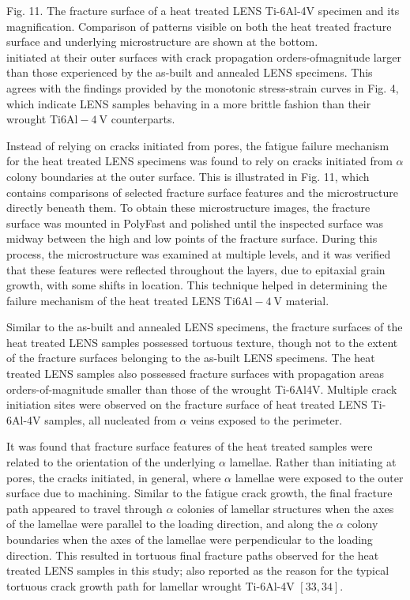 \documentclass[10pt]{article}
\begin{document}
Fig. 11. The fracture surface of a heat treated LENS Ti-6Al-4V specimen and its magnification. Comparison of patterns visible on both the heat treated fracture surface and underlying microstructure are shown at the bottom.\\
initiated at their outer surfaces with crack propagation orders-ofmagnitude larger than those experienced by the as-built and annealed LENS specimens. This agrees with the findings provided by the monotonic stress-strain curves in Fig. 4, which indicate LENS samples behaving in a more brittle fashion than their wrought Ti$6 \mathrm{Al}-4 \mathrm{~V}$ counterparts.

Instead of relying on cracks initiated from pores, the fatigue failure mechanism for the heat treated LENS specimens was found to rely on cracks initiated from $\alpha$ colony boundaries at the outer surface. This is illustrated in Fig. 11, which contains comparisons of selected fracture surface features and the microstructure directly beneath them. To obtain these microstructure images, the fracture surface was mounted in PolyFast and polished until the inspected surface was midway between the high and low points of the fracture surface. During this process, the microstructure was examined at multiple levels, and it was verified that these features were reflected throughout the layers, due to epitaxial grain growth, with some shifts in location. This technique helped in determining the failure mechanism of the heat treated LENS Ti$6 \mathrm{Al}-4 \mathrm{~V}$ material.

Similar to the as-built and annealed LENS specimens, the fracture surfaces of the heat treated LENS samples possessed tortuous texture, though not to the extent of the fracture surfaces belonging to the as-built LENS specimens. The heat treated LENS samples also possessed fracture surfaces with propagation areas orders-of-magnitude smaller than those of the wrought Ti-6Al4V. Multiple crack initiation sites were observed on the fracture surface of heat treated LENS Ti-6Al-4V samples, all nucleated from $\alpha$ veins exposed to the perimeter.

It was found that fracture surface features of the heat treated samples were related to the orientation of the underlying $\alpha$ lamellae. Rather than initiating at pores, the cracks initiated, in general, where $\alpha$ lamellae were exposed to the outer surface due to machining. Similar to the fatigue crack growth, the final fracture path appeared to travel through $\alpha$ colonies of lamellar structures when the axes of the lamellae were parallel to the loading direction, and along the $\alpha$ colony boundaries when the axes of the lamellae were perpendicular to the loading direction. This resulted in tortuous final fracture paths observed for the heat treated LENS samples in this study; also reported as the reason for the typical tortuous crack growth path for lamellar wrought Ti-6Al-4V $[33,34]$.
\end{document}
